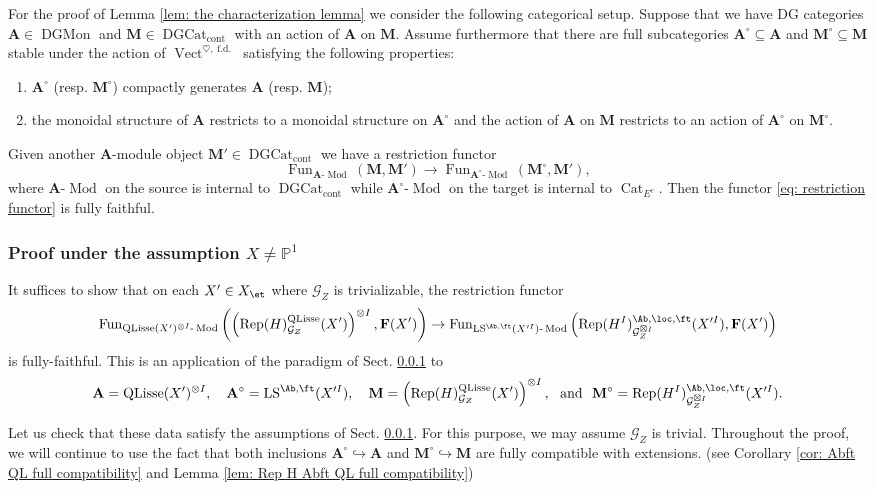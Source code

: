 \documentclass[10pt]{amsart}
\newcommand{\sssec}{\subsubsection}
\theoremstyle{remark}
\newcommand{\te}{\text}
\newcommand{\pjl}{\mathbb{P}^1}
\newcommand{\on}{\operatorname}
\newcommand{\cG}{\mathcal{G}}
\newcommand{\Cat}{\on{Cat}}
\newcommand{\CatEc}{\Cat_{E^c}}
\newcommand{\DGcat}{\on{DGCat}_{\on{cont}}}
\newcommand{\DGCatMon}{\on{DGMon}}
\newcommand{\lMod}{\text{-}\on{Mod}}
\newcommand{\Rep}{\on{Rep}}
\newcommand{\Vect}{\on{Vect}}
\newcommand{\LS}{\on{LS}}
\newcommand{\QLisse}{\on{QLisse}}
\newcommand{\Fun}{\on{Fun}}
\newcommand{\bA}{\mathbf{A}}
\newcommand{\bM}{\mathbf{M}}
\begin{document}
    \sssec{}\label{sssec: char paradigm} For the proof of Lemma \ref{lem: the characterization lemma} we consider the following categorical setup.
    Suppose that we have DG categories $\bA\in\DGCatMon$ and $\bM\in\DGcat$ with an action of $\bA$ on $\bM$. Assume furthermore that there are full subcategories $\bA^{\circ}\subseteq \bA$ and $\bM^{\circ}\subseteq \bM$ stable under the action of $\Vect^{\heartsuit,\on{f.d.}}$ satisfying the following properties:
    \begin{enumerate}
        \item $\bA^{\circ}$ (resp. $\bM^{\circ}$) compactly generates $\bA$ (resp. $\bM$);
        \item the monoidal structure of $\bA$ restricts to a monoidal structure on $\bA^{\circ}$ and the action of $\bA$ on $\bM$ restricts to an action of $\bA^{\circ}$ on $\bM^{\circ}$.
    \end{enumerate}
    Given another $\bA$-module object $\bM'\in \DGcat$ we have a restriction functor
    \begin{equation}\label{eq: restriction functor}
        \Fun_{\bA\lMod}(\bM,\bM')\rightarrow \Fun_{\bA^{\circ}\lMod}(\bM^{\circ}, \bM'),
    \end{equation}
    where $\bA\lMod$ on the source is internal to $\DGcat$ while $\bA^{\circ}\lMod$ on the target is internal to $\CatEc$. Then the functor \eqref{eq: restriction functor} is fully faithful.

    
    
    \sssec{Proof under the assumption $X\ne\pjl$}
        It suffices to show that on each $X'\in X_{\et}$ where $\cG_Z$ is trivializable, the restriction functor
        \[\Fun_{\QLisse(X')^{\otimes I}\lMod}\left(\left(\Rep(H)^{\QLisse}_{\cG_Z}(X')\right)^{\otimes I}, \mathbf{F}(X')\right)\rightarrow \Fun_{\LS^{\Ab,\ft}(X'^I)\lMod}\left(\Rep(H^I)^{\Ab,\loc,\ft}_{\cG^{\boxtimes I}_Z}(X'^I),\mathbf{F}(X')\right)\]
        is fully-faithful. This is an application of the paradigm of Sect. \ref{sssec: char paradigm} to
        \[\bA=\QLisse(X')^{\otimes I},\quad \bA^{\circ}=\LS^{\Ab,\ft}(X'^I),\quad \mathbf{M}=\left(\Rep(H)^{\QLisse}_{\cG_Z}(X')\right)^{\otimes I},\ \ \te{and}\ \ \mathbf{M}^{\circ}=\Rep(H^I)^{\Ab,\loc,\ft}_{\cG^{\boxtimes I}_Z}(X'^I).\]
        
        Let us check that these data satisfy the assumptions of Sect. \ref{sssec: char paradigm}. For this purpose, we may assume $\cG_Z$ is trivial. Throughout the proof, we will continue to use the fact that both inclusions
        $\bA^{\circ}\hookrightarrow \bA$ and $\bM^{\circ}\hookrightarrow\bM$
        are fully compatible with extensions. (see Corollary \ref{cor: Abft QL full compatibility} and Lemma \ref{lem: Rep H Abft QL full compatibility})
        \medskip
        
\end{document}
